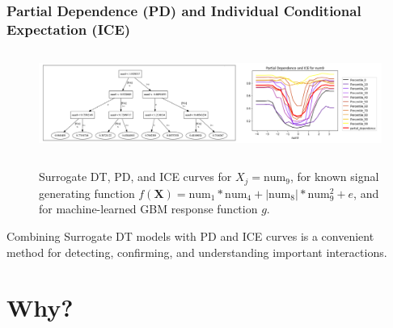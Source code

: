 \documentclass[11pt,aspectratio=169,hyperref={colorlinks}]{beamer}
\begin{document}
	\begin{frame}[t]
		
		\frametitle{Partial Dependence (PD) and Individual Conditional Expectation (ICE)}
		
		\vspace{-20pt}
		
		\begin{figure}[htb]
			\begin{center}
				\label{fig:dt_surrogate_pdp_ice}
				\includegraphics[height=95pt]{../img/dt_surrogate2_pdp_ice2.png}
				\caption{Surrogate DT, PD, and ICE curves for $ X_j = \text{num}_9$, for known signal generating function $f(\mathbf{X}) = \text{num} _1 * \text{num}_4 + |\text{num}_8| * \text{num}_9^2 + e$, and for machine-learned GBM response function $g$.}
			\end{center}
		\end{figure}
		
		Combining Surrogate DT models with PD and ICE curves is a convenient method for detecting, confirming, and understanding important interactions. 
		
	\end{frame}

	\section{Why?}
	
	\subsection*{} %
\end{document}
